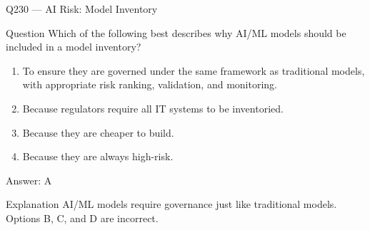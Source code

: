 \documentclass[aspectratio=169,8pt]{beamer}
\begin{document}
																																					\begin{frame}{Q230 --- AI Risk: Model Inventory}
																																						\begin{block}{Question}
																																							Which of the following best describes why AI/ML models should be included in a model inventory?
																																							\begin{enumerate}
																																								\item To ensure they are governed under the same framework as traditional models, with appropriate risk ranking, validation, and monitoring.
																																								\item Because regulators require all IT systems to be inventoried.
																																								\item Because they are cheaper to build.
																																								\item Because they are always high-risk.
																																							\end{enumerate}  \end{block}
																																							\begin{exampleblock}{Answer: A}\end{exampleblock}
																																							\begin{block}{Explanation}
																																								AI/ML models require governance just like traditional models. Options B, C, and D are incorrect.
																																							\end{block}
																																						\end{frame}
																																						
\end{document}
